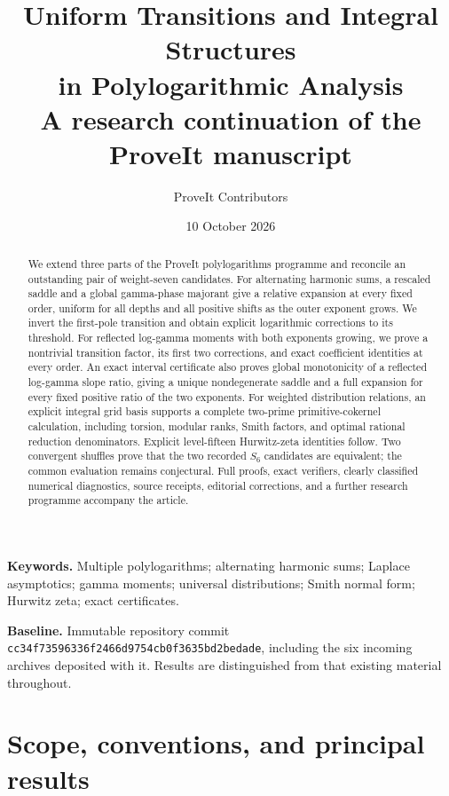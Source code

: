 \documentclass[11pt,a4paper]{article}
\title{Uniform Transitions and Integral Structures\\[4pt]
in Polylogarithmic Analysis\\[10pt]
\large A research continuation of the ProveIt manuscript}
\author{ProveIt Contributors}
\date{10 October 2026}
\numberwithin{equation}{section}
\theoremstyle{plain}
\theoremstyle{definition}
\theoremstyle{remark}
\begin{document}
\maketitle
\begin{abstract}
We extend three parts of the ProveIt polylogarithms programme and
reconcile an outstanding pair of weight-seven candidates. For
alternating harmonic sums, a rescaled saddle and a global gamma-phase
majorant give a relative expansion at every fixed order, uniform for
all depths and all positive shifts as the outer exponent grows.
We invert the first-pole transition and obtain explicit logarithmic
corrections to its threshold. For reflected log-gamma moments with
both exponents growing, we prove a nontrivial transition factor,
its first two corrections, and exact coefficient identities at
every order. An exact interval certificate also proves global
monotonicity of a reflected log-gamma slope ratio, giving a unique
nondegenerate saddle and a full expansion for every fixed positive
ratio of the two exponents. For weighted distribution relations, an explicit
integral grid basis supports a complete two-prime primitive-cokernel
calculation, including torsion, modular ranks, Smith factors, and
optimal rational reduction denominators. Explicit level-fifteen
Hurwitz-zeta identities follow. Two convergent shuffles prove that
the two recorded $S_6$ candidates are equivalent; the common
evaluation remains conjectural. Full proofs, exact verifiers,
clearly classified numerical diagnostics, source receipts,
editorial corrections, and a further research programme accompany
the article.
\end{abstract}
\medskip
\noindent\textbf{Keywords.} Multiple polylogarithms; alternating harmonic
sums; Laplace asymptotics; gamma moments; universal distributions;
Smith normal form; Hurwitz zeta; exact certificates.
\medskip
\par\noindent\textbf{Baseline.} Immutable repository commit
\texttt{cc34f73596336f2466d9754cb0f3635bd2bedade}, including the six
incoming archives deposited with it. Results are distinguished from
that existing material throughout.
\clearpage
\begingroup
\small
\linespread{0.95}\selectfont
\tableofcontents
\endgroup
\clearpage


\section{Scope, conventions, and principal results}
\label{cont:sec:introduction}
\end{document}

